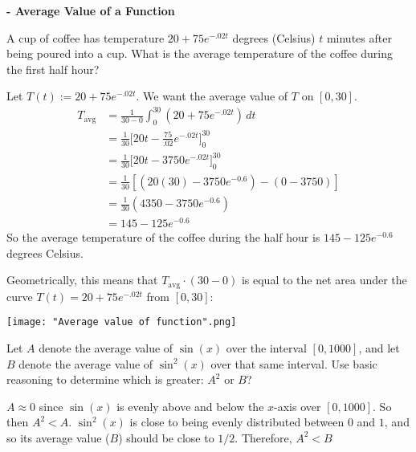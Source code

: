 \documentclass[nooutcomes]{ximera}
\renewcommand{\d}{\,d}
\newcommand{\dfn}{\textbf}
\newcommand{\eval}[1]{\bigg[ #1 \bigg]}
\renewenvironment{freeResponse}{
\ifhandout\setbox0\vbox\bgroup\else
\begin{trivlist}\item[\hskip \labelsep\bfseries Solution:\hspace{2ex}]
\fi}
{\ifhandout\egroup\else
\end{trivlist}
\fi}
\begin{document}
\begin{problem}
\dfn{- Average Value of a Function}
	\begin{enumerate}
	
	\item  A cup of coffee has temperature $20 + 75e^{-.02t}$ degrees (Celsius) $t$ minutes after being poured into a cup.  
	What is the average temperature of the coffee during the first half hour?
		\begin{freeResponse}
		Let $T(t) := 20 + 75e^{-.02t}$.  We want the average value of $T$ on $[0,30]$.
			\begin{align*}
			T_{\text{avg}} &= \frac{1}{30-0} \int_0^{30} \left( 20 + 75e^{-.02t} \right) \d t  \\
			&= \frac{1}{30} \eval{20t - \frac{75}{.02} e^{-.02t}}_0^{30}  \\
			&= \frac{1}{30} \eval{20t - 3750 e^{-.02t}}_0^{30}  \\
			&= \frac{1}{30} \left[ \left( 20(30) - 3750e^{-0.6} \right) - (0 - 3750) \right]  \\
			&= \frac{1}{30} \left( 4350 - 3750e^{-0.6} \right)  \\
			&= 145 - 125e^{-0.6} 
			\end{align*}
		So the average temperature of the coffee during the half hour is $145 - 125e^{-0.6}$ degrees Celsius.

                Geometrically, this means that $T_{\text{avg}} \cdot (30 - 0)$ is equal to the net area under the curve $T(t) = 20 + 75e^{-.02t}$ from $[0, 30]$:
                \begin{image}
                  \texttt{[image: "Average value of function".png]}
                \end{image}

		\end{freeResponse}
		
		
		
	\item  Let $A$ denote the average value of $\sin(x)$ over the interval $[0,1000]$, 
	and let $B$ denote the average value of $\sin^2(x)$ over that same interval.  
	Use basic reasoning to determine which is greater:  $A^2$ or $B$?  
		\begin{freeResponse}
		$A \approx 0$ since $\sin(x)$ is evenly above and below the $x$-axis over $[0,1000]$.  
		So then $A^2 < A$.  
		$\sin^2(x)$ is close to being evenly distributed between $0$ and $1$, and so its average value ($B$) should be close to $1/2$.  
		Therefore, $A^2 < B$
		\end{freeResponse}
		
		
		
	\end{enumerate}
		
		
		

\end{problem}
	
\end{document}
